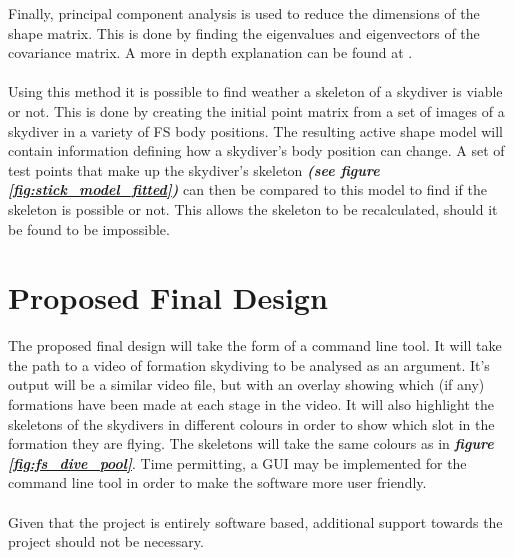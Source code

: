 \documentclass[a4paper, 12pt]{article}
\begin{document}
Finally, principal component analysis is used to reduce the dimensions of the shape matrix. This is done by finding the eigenvalues and eigenvectors of the covariance matrix. A more in depth explanation can be found at \cite{icl_pca}.\\
\\
Using this method it is possible to find weather a skeleton of a skydiver is viable or not. This is done by creating the initial point matrix from a set of images of a skydiver in a variety of FS body positions. The resulting active shape model will contain information defining how a skydiver's body position can change. A set of test points that make up the skydiver's skeleton \textbf{\emph{(see figure \ref{fig:stick_model_fitted})}} can then be compared to this model to find if the skeleton is possible or not. This allows the skeleton to be recalculated, should it be found to be impossible.
%
%
\section{Proposed Final Design}
%
The proposed final design will take the form of a command line tool. It will take the path to a video of formation skydiving to be analysed as an argument. It's output will be a similar video file, but with an overlay showing which (if any) formations have been made at each stage in the video. It will also highlight the skeletons of the skydivers in different colours in order to show which slot in the formation they are flying. The skeletons will take the same colours as in \textbf{\emph{figure \ref{fig:fs_dive_pool}}}. Time permitting, a GUI may be implemented for the command line tool in order to make the software more user friendly.\\
\\
Given that the project is entirely software based, additional support towards the project should not be necessary.
\end{document}
